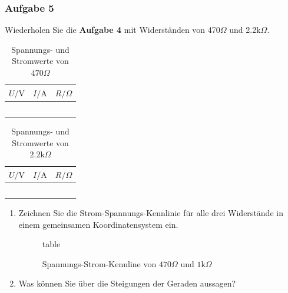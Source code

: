 \subsubsection{Aufgabe 5}
Wiederholen Sie die \textbf{Aufgabe 4} mit Widerständen von 470$\Omega$ und 2.2$\text{k}\Omega$.
\begin{table}[H]
\centering
\begin{tabular}{ccc}\hline
$U/\text{V}$&$I/\text{A}$&$R/\Omega$\\\hline
&&\\
&&\\
&&\\
&&\\
&&\\\hline
\end{tabular}
\caption{Spannungs- und Stromwerte von $470\Omega$}
\end{table} 
\begin{table}[H]
\centering
\begin{tabular}{ccc}\hline
$U/\text{V}$&$I/\text{A}$&$R/\Omega$\\\hline
&&\\
&&\\
&&\\
&&\\
&&\\\hline
\end{tabular}
\caption{Spannungs- und Stromwerte von $2.2\text{k}\Omega$}
\end{table} 
\begin{enumerate}[$a)$]
\item Zeichnen Sie die Strom-Spannungs-Kennlinie für alle drei Widerstände in einem gemeinsamen Koordinatensystem ein. 
\begin{figure}[H]
\centering
{}
\caption{Spannungs-Strom-Kennline von $470\Omega$ und $1\text{k}\Omega$}table
\end{figure}
\item Was können Sie über die Steigungen der Geraden aussagen?
\end{enumerate}
